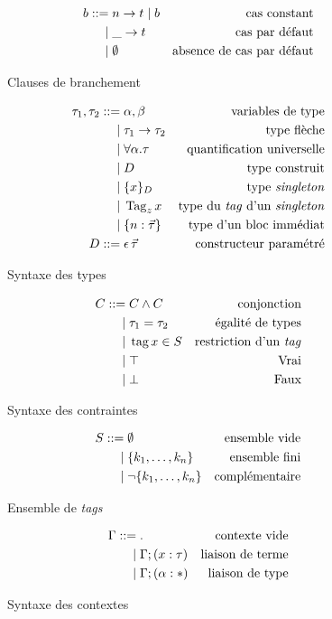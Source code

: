 \begin{figure}
\begin{align*}
  b ::=& \; n \rightarrow t \; | \; b
    & \text{cas constant}
  \\ |& \;  \_ \rightarrow t
    & \text{cas par défaut}
  \\ |& \;  \emptyset
    & \text{absence de cas par défaut}
\end{align*}
\caption{Clauses de branchement}
\end{figure}

\begin{figure}
\begin{align*}
  \tau_1, \tau_2 ::=& \; \alpha, \beta
    & \text{variables de type}
  \\ |& \;  \tau_1 \rightarrow \tau_2
    & \text{type flèche}
  \\ |& \;  \forall \alpha. \tau
    & \text{quantification universelle}
  \\ |& \;  D
    & \text{type construit}
  \\ |& \;  \{ x \}_D
    & \text{type \emph{singleton}}
  \\ |& \;  \operatorname{Tag}_z x
    & \text{type du \emph{tag} d'un \emph{singleton}}
  \\ |& \;  \{ n: \vec{\tau} \}
    & \text{type d'un bloc immédiat}
  \\
  D ::=& \; \epsilon \, \vec{\tau}
    & \text{constructeur paramétré}
\end{align*}
\caption{Syntaxe des types}
\end{figure}

\begin{figure}
\begin{align*}
  C ::=& \; C \wedge C
    & \text{conjonction}
  \\ |& \;  \tau_1 = \tau_2
    & \text{égalité de types}
  \\ |& \;  \operatorname{tag} x \in S
    & \text{restriction d'un \emph{tag}}
  \\ |& \;  \top
    & \text{Vrai}
  \\ |& \;  \bot
    & \text{Faux}
\end{align*}
\caption{Syntaxe des contraintes}
\end{figure}

\begin{figure}
\begin{align*}
  S ::=& \; \emptyset
    & \text{ensemble vide}
  \\ |& \;  \{ k_1, \ldots, k_n \}
    & \text{ensemble fini}
  \\ |& \;  \lnot \{ k_1, \ldots, k_n \}
    & \text{complémentaire}
\end{align*}
\caption{Ensemble de \emph{tags}}
\end{figure}

\begin{figure}
\begin{align*}
  \Gamma ::=& \; .
    & \text{contexte vide}
  \\ |& \; \Gamma; (x : \tau)
    & \text{liaison de terme}
  \\ |& \; \Gamma; (\alpha : *)
    & \text{liaison de type}
\end{align*}
\caption{Syntaxe des contextes}
\end{figure}

